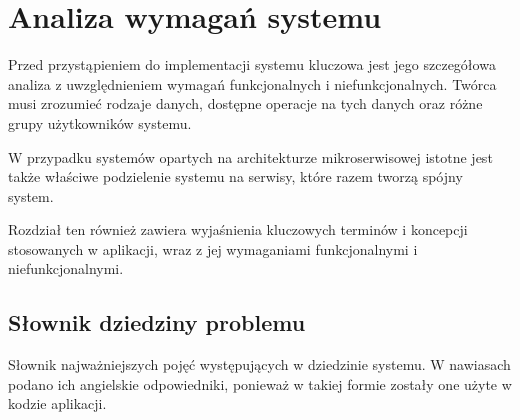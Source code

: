 \clearpage %

\section{Analiza wymagań systemu}

Przed przystąpieniem do implementacji systemu kluczowa jest jego szczegółowa analiza z uwzględnieniem wymagań funkcjonalnych i niefunkcjonalnych. Twórca musi zrozumieć rodzaje danych, dostępne operacje na tych danych oraz różne grupy użytkowników systemu.

W przypadku systemów opartych na architekturze mikroserwisowej istotne jest także właściwe podzielenie systemu na serwisy, które razem tworzą spójny system.

Rozdział ten również zawiera wyjaśnienia kluczowych terminów i koncepcji stosowanych w aplikacji, wraz z jej wymaganiami funkcjonalnymi i niefunkcjonalnymi.

\subsection{Słownik dziedziny problemu}

Słownik najważniejszych pojęć występujących w dziedzinie systemu. W nawiasach podano ich angielskie odpowiedniki, ponieważ w takiej formie zostały one użyte w kodzie aplikacji.

